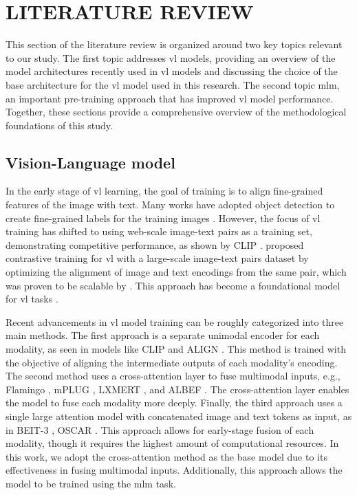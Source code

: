 \chapter{LITERATURE REVIEW}
This section of the literature review is organized around two key topics relevant to our study.
The first topic addresses \acrshort{vl} models, providing an overview of the model architectures recently used in \acrshort{vl} models and discussing the choice of the base architecture for the \acrshort{vl} model used in this research.
The second topic \acrshort{mlm}, an important pre-training approach that has improved \acrshort{vl} model performance.
Together, these sections provide a comprehensive overview of the methodological foundations of this study.

\section{Vision-Language model}
In the early stage of \acrshort{vl} learning, the goal of training is to align fine-grained features of the image with text. 
Many works have adopted object detection to create fine-grained labels for the training images \cite{uniter, vlmo}. 
However, the focus of \acrshort{vl} training has shifted to using web-scale image-text pairs as a training set, demonstrating competitive performance, as shown by CLIP \cite{clip}. 
 proposed contrastive training for \acrshort{vl} with a large-scale image-text pairs dataset by optimizing the alignment of image and text encodings from the same pair, which was proven to be scalable by . 
This approach has become a foundational model for \acrshort{vl} tasks \cite{foundation_model}.

Recent advancements in \acrshort{vl} model training can be roughly categorized into three main methods.  
The first approach is a separate unimodal encoder for each modality, as seen in models like CLIP \cite{clip} and ALIGN \cite{align}. 
This method is trained with the objective of aligning the intermediate outputs of each modality's encoding.  
The second method uses a cross-attention layer to fuse multimodal inputs, e.g., Flamingo \cite{flamingo}, mPLUG \cite{mplug}, LXMERT \cite{lxmert}, and ALBEF \cite{albef}. 
The cross-attention layer enables the model to fuse each modality more deeply.  
Finally, the third approach uses a single large attention model with concatenated image and text tokens as input, as in BEIT-3 \cite{beit-3}, OSCAR \cite{oscar}. 
This approach allows for early-stage fusion of each modality, though it requires the highest amount of computational resources.  
In this work, we adopt the cross-attention method as the base model due to its effectiveness in fusing multimodal inputs. 
Additionally, this approach allows the model to be trained using the \acrshort{mlm} task.

